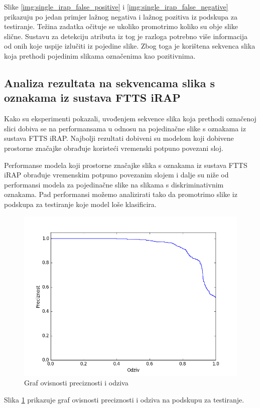 \documentclass[times, utf8, diplomski, numeric]{fer}
\begin{document}
Slike \ref{img:single_irap_false_positive} i \ref{img:single_irap_false_negative} prikazuju po jedan primjer lažnog negativa i lažnog pozitiva iz podskupa za testiranje.
Težina zadatka očituje se ukoliko promotrimo koliko su obje slike slične.
Sustavu za detekciju atributa iz tog je razloga potrebno više informacija od onih koje uspije izlučiti iz pojedine slike.
Zbog toga je korištena sekvenca slika koja prethodi pojedinim slikama označenima kao pozitivnima.

\subsection{Analiza rezultata na sekvencama slika s oznakama iz sustava FTTS iRAP}
Kako su eksperimenti pokazali, uvođenjem sekvence slika koja prethodi označenoj slici dobiva se na performansama u odnosu na pojedinačne slike s oznakama iz sustava FTTS iRAP. 
Najbolji rezultati dobiveni su modelom koji dobivene prostorne značajke obrađuje koristeći vremenski potpuno povezani sloj.

Performanse modela koji prostorne značajke slika s oznakama iz sustava FTTS iRAP obrađuje vremenskim potpuno povezanim slojem i dalje su niže od performansi modela za pojedinačne slike na slikama s diskriminativnim oznakama.
Pad performansi možemo analizirati tako da promotrimo slike iz podskupa za testiranje koje model loše klasificira. 

\begin{figure}[H]
\centering
\includegraphics[scale=0.55]{images/pr_temporal.png}
\caption{Graf ovisnosti preciznosti i odziva}
\label{img:pr_temporal}
\end{figure}
Slika \ref{img:pr_temporal} prikazuje graf ovisnosti preciznosti i odziva na podskupu za testiranje.
\end{document}
